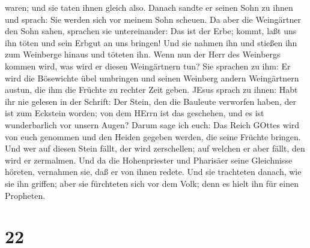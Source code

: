 waren; und sie taten ihnen gleich also.  Danach sandte er
seinen Sohn zu ihnen und sprach: Sie werden sich vor meinem Sohn
scheuen.  Da aber die Weingärtner den Sohn sahen, sprachen
sie untereinander: Das ist der Erbe; kommt, laßt uns ihn töten und sein
Erbgut an uns bringen!  Und sie nahmen ihn und stießen ihn
zum Weinberge hinaus und töteten ihn.  Wenn nun der Herr
des Weinbergs kommen wird, was wird er diesen Weingärtnern tun?
 Sie sprachen zu ihm: Er wird die Bösewichte übel umbringen
und seinen Weinberg andern Weingärtnern austun, die ihm die Früchte zu
rechter Zeit geben.  JEsus sprach zu ihnen: Habt ihr nie
gelesen in der Schrift: Der Stein, den die Bauleute verworfen haben, der
ist zum Eckstein worden; von dem HErrn ist das geschehen, und es ist
wunderbarlich vor unsern Augen?  Darum sage ich euch: Das
Reich GOttes wird von euch genommen und den Heiden gegeben werden, die
seine Früchte bringen.  Und wer auf diesen Stein fällt, der
wird zerschellen; auf welchen er aber fällt, den wird er zermalmen.
 Und da die Hohenpriester und Pharisäer seine Gleichnisse
höreten, vernahmen sie, daß er von ihnen redete.  Und sie
trachteten danach, wie sie ihn griffen; aber sie fürchteten sich vor dem
Volk; denn es hielt ihn für einen Propheten.

\hypertarget{section-21}{%
\section{22}\label{section-21}}

